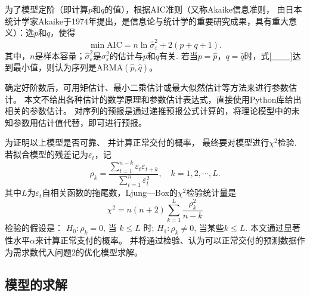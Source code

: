 为了模型定阶（即计算$p$和$q$的值），根据AIC准则（又称Akaike信息准则， 由日本统计学家Akaike于1974年提出，是信息论与统计学的重要研究成果，具有重大意义\cite{张波2004应用随机过程}）：选$p$和$q$，使得
\begin{equation}\label{___}
	\min \mathrm{AIC}=n \ln \hat{\sigma}_{\varepsilon}^{2}+2(p+q+1).
\end{equation}
其中，$n$是样本容量；$\hat{\sigma}_{\varepsilon}^{2}$是${\sigma}_{\varepsilon}^{2}$的估计与$p$和$q$有关. 若当$p = \hat{p}，q = \hat{q}$时，式\ref{___}达到最小值，则认为序列是ARMA$(\hat{p}, \hat{q})$。

确定好阶数后，可用矩估计、最小二乘估计或最大似然估计等方法来进行参数估计。
本文不给出各种估计的数学原理和参数估计表达式，直接使用Python库给出相关的参数估计。
对序列的预报是通过递推预报公式计算的，将理论模型中的未知参数用估计值代替，即可进行预报\cite{胡运权2003运筹学教程}。

为证明以上模型是否可靠、 并计算正常交付的概率， 最终要对模型进行$\chi^{2}$检验. 若拟合模型的残差记为$\varepsilon_{t}$，记
\begin{equation}
	\rho_{k}=\frac{\sum_{t=1}^{n-k} \varepsilon_{t} \varepsilon_{t+k}}{\sum_{t=1}^{n} \varepsilon_{t}^{2}},\quad k=1,2, \cdots, L.
\end{equation}
其中$L$为$\varepsilon_{t}$自相关函数的拖尾数，Ljung—Box的$\chi^{2}$检验统计量是
\begin{equation}
	\chi^{2}=n(n+2) \sum_{k=1}^{L} \frac{\rho_{k}^{2}}{n-k}
\end{equation}
检验的假设是： $H_{0}: \rho_{k}=0 \text {, 当 } k \leqslant L \text { 时; } H_{1}: \rho_{k} \neq 0 \text {, 当某些}k\leqslant L.$
本文通过显著性水平$\alpha$来计算正常支付的概率。 并将通过检验、认为可以正常交付的预测数据作为需求数代入问题2的优化模型求解。

\subsection{模型的求解} %
\label{sub:模型的求解}

